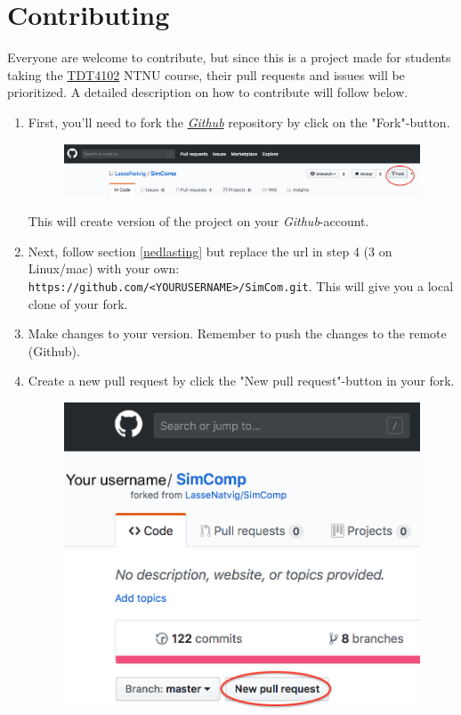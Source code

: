 \section{Contributing}
Everyone are welcome to contribute, but since this is a project made for students taking the \href{https://www.ntnu.edu/studies/courses/TDT4102}{TDT4102} NTNU course, their pull requests and issues will be prioritized. A detailed description on how to contribute will follow below.

\begin{enumerate}
    \item First, you'll need to fork the \href{https://github.com/LasseNatvig/SimComp}{\textit{Github}} repository by click on the "Fork"-button.
    \begin{figure}[H]
        \centering
        \includegraphics[scale=0.3]{img/Fork.png}
        \label{fig:fork}
    \end{figure}
    This will create version of the project on your \textit{Github}-account. 
    \item Next, follow section \ref{nedlasting} but replace the url in step 4 (3 on Linux/mac) with your own: \texttt{https://github.com/<YOURUSERNAME>/SimCom.git}. This will give you a local clone of your fork.
    \item Make changes to your version. Remember to push the changes to the remote (Github).
    \item Create a new pull request by click the "New pull request"-button in your fork. 
    \begin{figure}[H]
        \centering
        \includegraphics[scale=0.3]{img/Newpullrequest.png}

\end{figure}
\end{enumerate}
